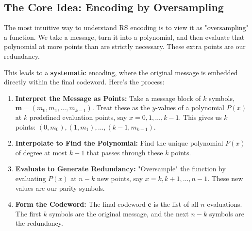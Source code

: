 \documentclass{article}
\begin{document}
\subsection{The Core Idea: Encoding by Oversampling}
The most intuitive way to understand RS encoding is to view it as "oversampling" a function. We take a message, turn it into a polynomial, and then evaluate that polynomial at more points than are strictly necessary. These extra points are our redundancy.

This leads to a \textbf{systematic} encoding, where the original message is embedded directly within the final codeword. Here's the process:

\begin{enumerate}
    \item \textbf{Interpret the Message as Points:} Take a message block of $k$ symbols, $\mathbf{m} = (m_0, m_1, \dots, m_{k-1})$. Treat these as the $y$-values of a polynomial $P(x)$ at $k$ predefined evaluation points, say $x = 0, 1, \dots, k-1$. This gives us $k$ points: $(0, m_0), (1, m_1), \dots, (k-1, m_{k-1})$.
    \item \textbf{Interpolate to Find the Polynomial:} Find the unique polynomial $P(x)$ of degree at most $k-1$ that passes through these $k$ points.
    \item \textbf{Evaluate to Generate Redundancy:} "Oversample" the function by evaluating $P(x)$ at $n-k$ new points, say $x=k, k+1, \dots, n-1$. These new values are our parity symbols.
    \item \textbf{Form the Codeword:} The final codeword $\mathbf{c}$ is the list of all $n$ evaluations. The first $k$ symbols are the original message, and the next $n-k$ symbols are the redundancy.
\end{enumerate}
\end{document}
